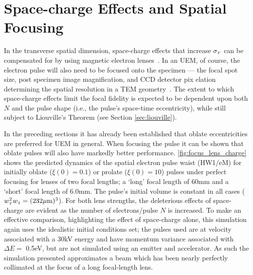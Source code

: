 
\section{Space-charge Effects and Spatial Focusing} \label{sec:mag_lens_charge}

In the transverse spatial dimension, space-charge effects that increase $ \sigma_{ {\scriptscriptstyle T} } $ can be compensated for by using magnetic electron lenses~\cite{oudheusden_electron_2007,lagrange_nanosecond_2008}.
In an UEM, of course, the electron pulse will also need to be focused onto the specimen --- the focal spot size, post specimen image magnification, and CCD detector pix elation determining the spatial resolution in a TEM geometry~\cite{berger_dc_2009}.
The extent to which space-charge effects limit the focal fidelity is expected to be dependent upon both $N$ and the pulse shape (i.e., the pulse's space-time eccentricity), while still subject to Liouville's Theorem (see Section \ref{sec:liouville}).



In the preceding sections it has already been established that oblate eccentricities are preferred for UEM in general.
When focusing the pulse it can be shown that oblate pulses will also have markedly better performance.
\ref{fig:focus_lens_charge} shows the predicted dynamics of the spatial electron pulse waist (HW1/eM) for initially oblate ($ \xi ( 0 ) = 0.1 $) or prolate ($ \xi ( 0 ) = 10 $) pulses under perfect focusing for lenses of two focal lengths; a `long' focal length of 60mm and a `short' focal length of 6.0mm.
The pulse's initial volume is constant in all cases ($w_{{\scriptscriptstyle T}}^2 w_{z} = (232 \mu\text{m})^3$).
For both lens strengths, the deleterious effects of space-charge are evident as the number of electrons/pulse $ N $ is increased.
To make an effective comparison, highlighting the effect of space-charge alone, this simulation again uses the idealistic initial conditions set; the pulses used are at velocity associated with a 30kV energy and have momentum variance associated with $\Delta E = $ 0.5eV, but are not simulated using an emitter and accelerator.
As such the simulation presented approximates a beam which has been nearly perfectly collimated at the focus of a long focal-length lens.

